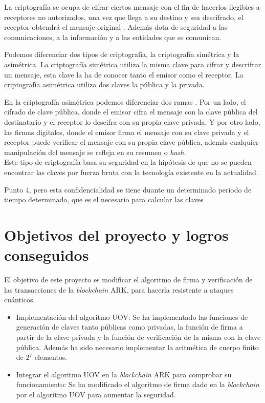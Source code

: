 La criptografía se ocupa de cifrar ciertos mensaje con el fin de hacerlos ilegibles a receptores no autorizados, una vez que llega a su destino y sea descifrado, el receptor obtendrá el mensaje original \cite{criptografia}. Además dota de seguridad a las comunicaciones, a la información y a las entidades que se comunican.

Podemos diferenciar dos tipos de criptografía, la criptografía simétrica y la asimétrica. La criptografía simétrica utiliza la misma clave para cifrar y descrifrar un mensaje, esta clave la ha de conocer tanto el emisor como el receptor. La criptografía asimétrica utiliza dos claves la pública y la privada.

En la criptografía asimétrica podemos diferenciar dos ramas \cite{criptografia-asimetrica}. Por un lado, el cifrado de clave pública, donde el emisor cifra el mensaje con la clave pública del destinatario y el receptor lo descifra con su propia clave privada. Y por otro lado, las firmas digitales, donde el emisor firma el mensaje con su clave privada y el receptor puede verificar el mensaje con su propia clave pública, además cualquier manipulación del mensaje se refleja en su resumen o \textit{hash}.\\

Este tipo de criptografía basa su seguridad en la hipótesis de que no se pueden encontrar las claves por fuerza bruta con la tecnología existente en la actualidad.

Punto 4, pero esta confidencialidad se tiene duante un determinado período de tiempo determinado, que es el necesario para calcular las claves


\section{Objetivos del proyecto y logros conseguidos}
\label{sec:intro:objetivos}
El objetivo de este proyecto es modificar el algoritmo de firma y verificación de las transacciones de la \textit{blockchain} ARK, para hacerla resistente a ataques cuánticos.

\begin{itemize}
	\item Implementación del algoritmo UOV: Se ha implementado las funciones de generación de claves tanto públicas como privadas, la función de firma a partir de la clave privada y la función de verificación de la misma con la clave pública. Además ha sido necesario implementar la aritmética de cuerpo finito de $2^7$ elementos.
	\item Integrar el algoritmo UOV en la \textit{blockchain} ARK para comprobar su funcionamiento: Se ha modificado el algoritmo de firma dado en la \textit{blockchain} por el algoritmo UOV para aumentar la seguridad.

\end{itemize}



